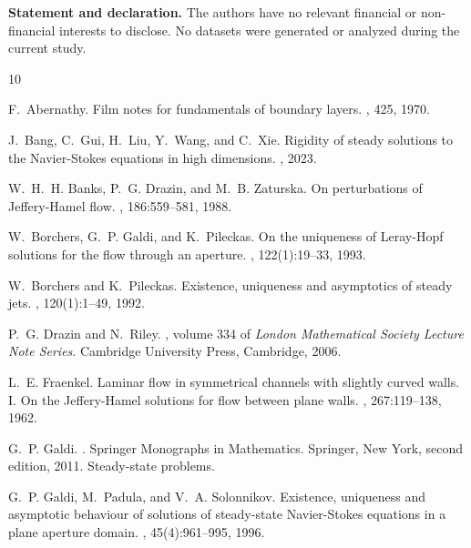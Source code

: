 \documentclass[reqno,12pt]{amsart}
\begin{document}
\medskip
	{\bf Statement and declaration.} The authors have no relevant financial or non-financial interests to disclose. No datasets were generated or analyzed during the current study.



\begin{thebibliography}{10}
	
	F.~Abernathy.
	\newblock Film notes for fundamentals of boundary layers.
	, 425, 1970.
	
	J.~Bang, C.~Gui, H.~Liu, Y.~Wang, and C.~Xie.
	\newblock Rigidity of steady solutions to the {N}avier-{S}tokes equations in
	high dimensions.
	, 2023.
	
	W.~H.~H. Banks, P.~G. Drazin, and M.~B. Zaturska.
	\newblock On perturbations of {J}effery-{H}amel flow.
	, 186:559--581, 1988.
	
	W.~Borchers, G.~P. Galdi, and K.~Pileckas.
	\newblock On the uniqueness of {L}eray-{H}opf solutions for the flow through an
	aperture.
	, 122(1):19--33, 1993.
	
	W.~Borchers and K.~Pileckas.
	\newblock Existence, uniqueness and asymptotics of steady jets.
	, 120(1):1--49, 1992.
	
	P.~G. Drazin and N.~Riley.
	, volume 334 of {\em London Mathematical Society Lecture Note
		Series}.
	\newblock Cambridge University Press, Cambridge, 2006.
	
	L.~E. Fraenkel.
	\newblock Laminar flow in symmetrical channels with slightly curved walls. {I}.
	{O}n the {J}effery-{H}amel solutions for flow between plane walls.
	, 267:119--138, 1962.
	
	G.~P. Galdi.
	.
	\newblock Springer Monographs in Mathematics. Springer, New York, second
	edition, 2011.
	\newblock Steady-state problems.
	
	G.~P. Galdi, M.~Padula, and V.~A. Solonnikov.
	\newblock Existence, uniqueness and asymptotic behaviour of solutions of
	steady-state {N}avier-{S}tokes equations in a plane aperture domain.
	, 45(4):961--995, 1996.
	

\end{thebibliography}
\end{document}
